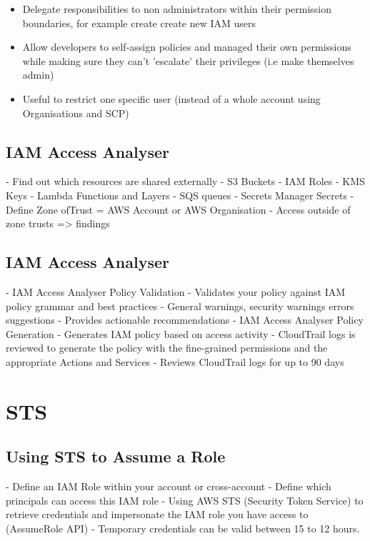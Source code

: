\documentclass[11pt]{book}
\begin{document}
    \begin{itemize}
        \item Delegate responsibilities to non administrators within their permission boundaries, for example create create new IAM users
        \item Allow developers to self-assign policies and managed their own permissions while making sure they can't 'escalate' their privileges (i.e make themselves admin)
        \item Useful to restrict one specific user (instead of a whole account using Organisations and SCP)
    \end{itemize}

    \subsection{IAM Access Analyser}
    - Find out which resources are shared externally
    - S3 Buckets
    - IAM Roles
    - KMS Keys
    - Lambda Functions and Layers
    - SQS queues
    - Secrets Manager Secrets
    - Define Zone ofTrust = AWS Account or AWS Organisation
    - Access outside of zone trusts => findings

    \subsection{IAM Access Analyser}
    - IAM Access Analyser Policy Validation
    - Validates your policy against IAM policy grammar and best practices
    - General warnings, security warnings errors suggestions
    - Provides actionable recommendations
    - IAM Access Analyser Policy Generation
    - Generates IAM policy based on access activity
    - CloudTrail logs is reviewed to generate the policy with the fine-grained permissions and the appropriate Actions and Services
    - Reviews CloudTrail logs for up to 90 days


    \section{STS}

    \subsection{Using STS to Assume a Role}
    - Define an IAM Role within your account or cross-account
    - Define which principals can access this IAM role
    - Using AWS STS (Security Token Service) to retrieve credentials and impersonate the IAM role you have access to (AssumeRole API)
    - Temporary credentials can be valid between 15 to 12 hours.
\end{document}
